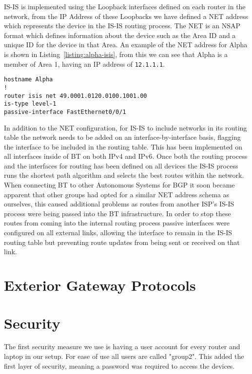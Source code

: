 IS-IS is implemented using the Loopback interfaces defined on each router in the
network, from the IP Address of these Loopbacks we have defined a NET address
which represents the device in the IS-IS routing process. The NET is an NSAP
format which defines information about the device such as the Area ID and a
unique ID for the device in that Area. An example of the NET address for Alpha
is shown in Listing~\ref{listing:alpha-isis}, from this we can see that Alpha is
a member of Area 1, having an IP address of \texttt{12.1.1.1}.

\begin{lstlisting}[caption={Alpha IS-IS Configuration}, label={listing:alpha-isis}]
hostname Alpha 
!  
router isis net 49.0001.0120.0100.1001.00  
is-type level-1  
passive-interface FastEthernet0/0/1  
\end{lstlisting}

In addition to the NET configuration, for IS-IS to include networks in its
routing table the network needs to be added on an interface-by-interface basis,
flagging the interface to be included in the routing table. This has been
implemented on all interfaces inside of BT on both IPv4 and IPv6. Once both the
routing process and the interfaces for routing has been defined on all devices
the IS-IS process runs the shortest path algorithm and selects the best routes
within the network. When connecting BT to other Autonomous Systems for BGP it
soon became apparent that other groups had opted for a similar NET address
schema as ourselves, this caused additional problems as routes from another
ISP's IS-IS process were being passed into the BT infrastructure. In order to
stop these routes from coming into the internal routing process passive
interfaces were configured on all external links, allowing the interface to
remain in the IS-IS routing table but preventing route updates from being sent
or received on that link.

\section{Exterior Gateway Protocols}
\section{Security}
The first security measure we use is having a user account for every router and
laptop in our setup. For ease of use all users are called "group2". This added
the first layer of security,  meaning a password was required to access the
devices.

